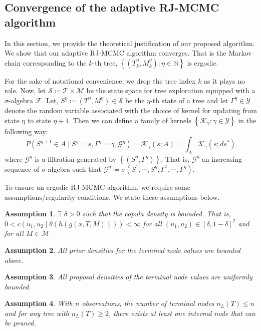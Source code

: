 \documentclass[
12pt]{article}
\newtheorem{assumption}{Assumption}[section]
\begin{document}
	
	
	\subsection{Convergence of the adaptive RJ-MCMC algorithm}
	
	In this section, we provide the theoretical justification of our proposed algorithm. We show that our adaptive RJ-MCMC algorithm converges. That is the Markov chain corresponding to the $k$-th tree, $\left\{\left(T_k^{\eta},M_k^{\eta}\right):\eta\in \mathbb{N}\right\}$ is ergodic. 
	
	For the sake of notational convenience, we drop the tree index $k$ as it plays no role. Now, let $\mathcal{S}\coloneqq\mathcal{T}\times \mathcal{M}$ be the state space for tree exploration equipped with a $\sigma$-algebra $\mathcal{F}$. Let,  $S^{\eta}\coloneqq\left(T^{\eta},M^{\eta}\right) \in \mathcal{S}$ be the $\eta$-th state of a tree and let $\Gamma^{\eta}\in \mathcal{Y}$ denote the random variable associated with the choice of kernel for updating from state $\eta$ to state $\eta+1$. Then we can define a family of kernels $\left\{\mathcal{K}_{\gamma}:\gamma\in\mathcal{Y}\right\}$ in the following way:
	\begin{equation*}
		P\left(S^{\eta+1} \in A\mid S^{\eta} = s, \Gamma^{\eta} = \gamma, \mathcal{G}^{\eta}\right) 
		= \mathcal{K}_{\gamma}(s;A)
		= \int_{A}\mathcal{K}_{\gamma}(s;ds^{\ast})
	\end{equation*}
	where $\mathcal{G}^{\eta}$ is a filtration generated by $\left\{(S^{\eta}, \Gamma^{\eta})\right\}$. That is, $\mathcal{G}^{\eta}$ an increasing sequence of $\sigma$-algebra such that $\mathcal{G}^{\eta} \coloneqq \sigma\left(S^1,\cdots,S^{\eta},\Gamma^1,\cdots,\Gamma^{\eta}\right)$.
	
	To ensure an ergodic RJ-MCMC algorithm, we require some assumptions/regularity conditions. We state these assumptions below.
	\begin{assumption}\label{ass:bounded:cop}
		$\exists$ \(\delta>0\) such that the copula density is bounded. That is, $0 < c(u_1,u_2\mid\theta(h(g(x,T,M)))) < \infty$ for all $(u_1,u_2)\in[\delta,1-\delta]^2$ and for all $M \in \mathcal{M}$
	\end{assumption}
	\begin{assumption}\label{ass:bounded:prior}
		All prior densities for the terminal node values are bounded above.
	\end{assumption}
	\begin{assumption}\label{ass:bounded:prop}
		All proposal densities of the terminal node values are uniformly bounded.
	\end{assumption}
	\begin{assumption}\label{ass:bounded:tree}
		With $n$ observations, the number of terminal nodes $n_L(T)\le n$ and for any tree with $n_L(T)\ge 2$, there exists at least one internal node that can be pruned.
	\end{assumption}
	
\end{document}
